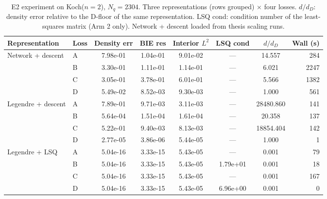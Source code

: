 \begin{table}[ht]
\centering
\caption{E2 experiment on Koch($n=2$), $N_q=2304$. Three representations (rows grouped) × four losses. $d/d_D$: density error relative to the D-floor of the same representation. LSQ cond: condition number of the least-squares matrix (Arm 2 only). Network + descent loaded from thesis scaling runs.}
\label{tab:e2-koch2}
\begin{tabular}{@{}llcccccr@{}}
\toprule
Representation & Loss & Density err & BIE res & Interior $L^2$ & LSQ cond & $d/d_D$ & Wall (s) \\
\midrule
  Network + descent & A & 7.98e-01 & 1.04e-01 & 9.01e-02 & — & 14.557 & 284 \\
   & B & 3.30e-01 & 1.11e-01 & 1.14e-01 & — & 6.021 & 2247 \\
   & C & 3.05e-01 & 3.78e-01 & 6.01e-01 & — & 5.566 & 1382 \\
   & D & 5.49e-02 & 8.52e-03 & 9.30e-03 & — & 1.000 & 561 \\
\midrule
  Legendre + descent & A & 7.89e-01 & 9.71e-03 & 3.11e-03 & — & 28480.860 & 141 \\
   & B & 5.64e-04 & 1.51e-04 & 1.61e-04 & — & 20.358 & 137 \\
   & C & 5.22e-01 & 9.40e-03 & 8.13e-03 & — & 18854.404 & 142 \\
   & D & 2.77e-05 & 3.86e-06 & 5.44e-05 & — & 1.000 & 1 \\
\midrule
  Legendre + LSQ & A & 5.04e-16 & 3.33e-15 & 5.43e-05 & — & 0.001 & 79 \\
   & B & 5.04e-16 & 3.33e-15 & 5.43e-05 & 1.79e+01 & 0.001 & 18 \\
   & C & 5.04e-16 & 3.33e-15 & 5.43e-05 & — & 0.001 & 167 \\
   & D & 5.04e-16 & 3.33e-15 & 5.43e-05 & 6.96e+00 & 0.001 & 0 \\
\bottomrule
\end{tabular}
\end{table}